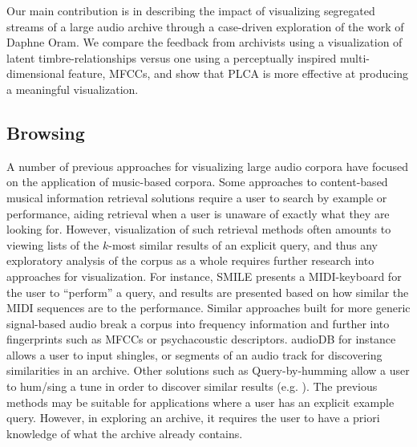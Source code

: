 \documentclass[a4paper,10pt,final]{ThesisStyle}
\begin{document}
Our main contribution is in describing the impact of visualizing segregated streams of a large audio archive through a case-driven exploration of the work of Daphne Oram.  We compare the feedback from archivists using a visualization of latent timbre-relationships versus one using a perceptually inspired multi-dimensional feature, MFCCs, and show that PLCA is more effective at producing a meaningful visualization.  


\subsection{Browsing}

A number of previous approaches for visualizing large audio corpora have focused on the application of music-based corpora.  Some approaches to content-based musical information retrieval solutions require a user to search by example or performance, aiding retrieval when a user is unaware of exactly what they are looking for.  However, visualization of such retrieval methods often amounts to viewing lists of the $k$-most similar results of an explicit query, and thus any exploratory analysis of the corpus as a whole requires further research into approaches for visualization.  For instance, SMILE \cite{Melucci2000} presents a MIDI-keyboard for the user to ``perform'' a query, and results are presented based on how similar the MIDI sequences are to the performance.  Similar approaches built for more generic signal-based audio break a corpus into frequency information and further into fingerprints such as MFCCs or psychacoustic descriptors.  audioDB \cite{Casey2008c,Rhodes2010} for instance allows a user to input shingles, or segments of an audio track for discovering similarities in an archive.  Other solutions such as Query-by-humming allow a user to hum/sing a tune in order to discover similar results (e.g. \cite{Wang2006a,Cartwright}).  The previous methods may be suitable for applications where a user has an explicit example query.  However, in exploring an archive, it requires the user to have a priori knowledge of what the archive already contains.
\end{document}
